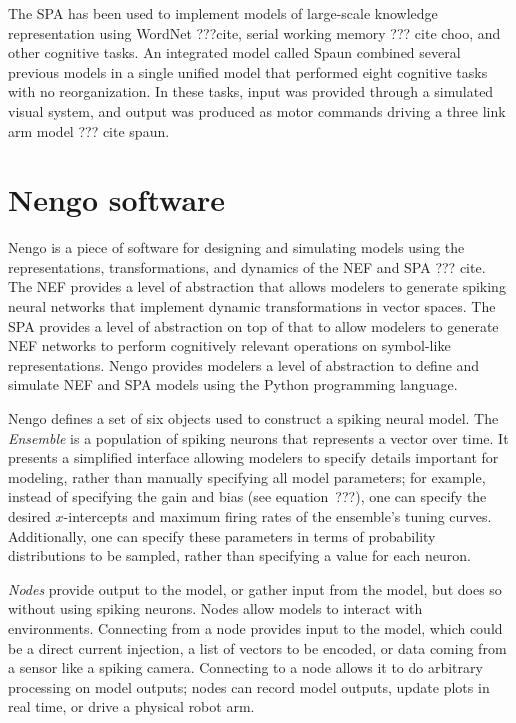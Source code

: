 {The SPA has been used to implement
models of large-scale knowledge representation
using WordNet ???cite,
serial working memory ??? cite choo,
and other cognitive tasks.
An integrated model called Spaun
combined several previous models
in a single unified model
that performed eight cognitive tasks
with no reorganization.
In these tasks, input was provided
through a simulated visual system,
and output was produced
as motor commands driving
a three link arm model ??? cite spaun.

\section{Nengo software}

Nengo is a piece of software
for designing and simulating
models using the representations,
transformations, and dynamics
of the NEF and SPA
??? cite.
The NEF provides a level of abstraction
that allows modelers to generate
spiking neural networks
that implement dynamic transformations
in vector spaces.
The SPA provides a level of abstraction
on top of that
to allow modelers to generate
NEF networks to perform
cognitively relevant operations
on symbol-like representations.
Nengo provides modelers
a level of abstraction to
define and simulate NEF and SPA models
using the Python programming language.

Nengo defines a set of six objects
used to construct a spiking neural model.
The \textit{Ensemble} is
a population of spiking neurons
that represents a vector over time.
It presents a simplified interface
allowing modelers to specify
details important for modeling,
rather than manually specifying
all model parameters;
for example, instead of specifying
the gain and bias
(see equation~???),
one can specify the desired
$x$-intercepts and maximum firing rates
of the ensemble's tuning curves.
Additionally, one can specify
these parameters in terms of
probability distributions
to be sampled,
rather than specifying a value for each neuron.

\textit{Nodes} provide output
to the model, or gather input from the model,
but does so without using spiking neurons.
Nodes allow models to interact with environments.
Connecting from a node provides input
to the model, which could be
a direct current injection,
a list of vectors to be encoded,
or data coming from a sensor
like a spiking camera.
Connecting to a node allows it
to do arbitrary processing on
model outputs;
nodes can record model outputs,
update plots in real time,
or drive a physical robot arm.

}
